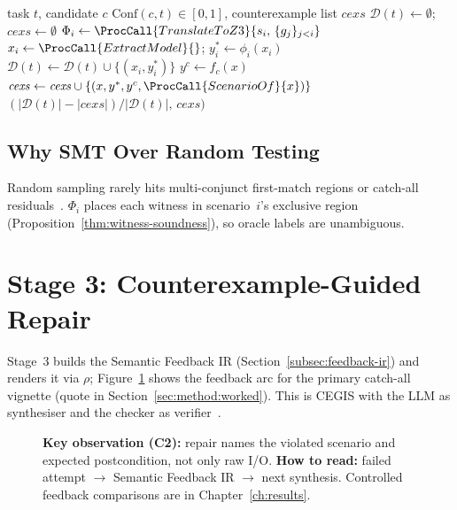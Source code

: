 \begin{algorithm}[t]
\caption{SMT-Driven Formal Conformance Checking}
\label{alg:checker}
\begin{algorithmic}[1]
\Require task $t$, candidate $c$
\Ensure $\mathrm{Conf}(c,t) \in [0,1]$, counterexample list $\mathit{cexs}$
\State $\mathcal{D}(t) \leftarrow \emptyset$; $\mathit{cexs} \leftarrow \emptyset$
  \State $\Phi_i \leftarrow \ProcCall{TranslateToZ3}{s_i,\, \{g_j\}_{j<i}}$
    \State $x_i \leftarrow \ProcCall{ExtractModel}{}$; $y_i^* \leftarrow \phi_i(x_i)$
    \State $\mathcal{D}(t) \leftarrow \mathcal{D}(t) \cup \{(x_i, y_i^*)\}$
  \EndIf
\EndFor
{}
  \State $y^c \leftarrow f_c(x)$
    \State $\mathit{cexs} \leftarrow \mathit{cexs} \cup
           \{(x, y^*, y^c, \ProcCall{ScenarioOf}{x})\}$
  \EndIf
\EndFor
\State \Return $(|\mathcal{D}(t)| - |\mathit{cexs}|)/|\mathcal{D}(t)|,\, \mathit{cexs})$
\end{algorithmic}
\end{algorithm}

\subsection{Why SMT Over Random Testing}
\label{subsec:method:smt-rationale}

Random sampling rarely hits multi-conjunct first-match regions or catch-all
residuals~\citep{claessen2000quickcheck, zhu1997specification}.
$\Phi_i$ places each witness in scenario~$i$'s exclusive region
(Proposition~\ref{thm:witness-soundness}), so oracle labels are unambiguous.

\section{Stage 3: Counterexample-Guided Repair}
\label{sec:method:repair}

Stage~3 builds the Semantic Feedback IR
(Section~\ref{subsec:feedback-ir}) and renders it via $\rho$;
Figure~\ref{fig:repair-feedback} shows the feedback arc for the primary
catch-all vignette (quote in Section~\ref{sec:method:worked}).
This is CEGIS with the LLM as synthesiser and the checker as
verifier~\citep{sun2024clover, solarlezama2008sketching}.

\begin{figure}[t]
  \centering
  \caption{\textbf{Key observation (C2):} repair names the violated scenario
    and expected postcondition, not only raw I/O.
    \textbf{How to read:} failed attempt $\to$ Semantic Feedback IR $\to$ next
    synthesis.
    Controlled feedback comparisons are in Chapter~\ref{ch:results}.}
  \label{fig:repair-feedback}
\end{figure}

